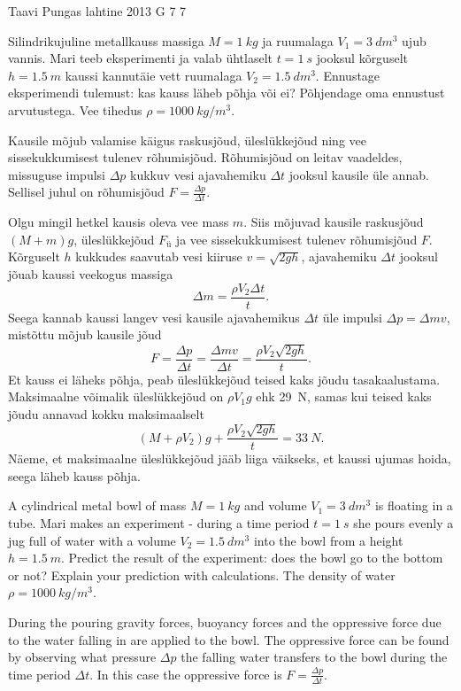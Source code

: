 {Taavi Pungas} %
{lahtine} %
{2013} %
{G 7} %
{7} %
{
\ifStatement
Silindrikujuline metallkauss massiga $M=\SI{1}{kg}$ ja ruumalaga
$V_1=\SI{3}{dm^3}$ ujub vannis. Mari teeb eksperimenti ja valab ühtlaselt
$t=\SI{1}{s}$ jooksul kõrguselt $h=\SI{1,5}{m}$ kaussi kannutäie vett ruumalaga
$V_2=\SI{1,5}{dm^3}$. Ennustage eksperimendi tulemust: kas kauss läheb põhja või
ei? Põhjendage oma ennustust arvutustega. Vee tihedus $\rho=\SI{1000}{kg/m^3}$.
\fi


\ifHint
Kausile mõjub valamise käigus raskusjõud, üleslükkejõud ning vee sissekukkumisest tulenev rõhumisjõud. Rõhumisjõud on leitav vaadeldes, missuguse impulsi $\Delta p$ kukkuv vesi ajavahemiku $\Delta t$ jooksul kausile üle annab. Sellisel juhul on rõhumisjõud $F = \frac{\Delta p}{\Delta t}$.
\fi


\ifSolution
Olgu mingil hetkel kausis oleva vee mass $m$. Siis mõjuvad kausile raskusjõud $(M+m)g$, üleslükkejõud $F_{ü}$ ja vee sissekukkumisest tulenev rõhumisjõud $F$. Kõrguselt $h$ kukkudes saavutab vesi kiiruse $v=\sqrt{2gh}$, ajavahemiku $\Delta t$ jooksul jõuab kaussi veekogus massiga
\[
\Delta m = \frac{\rho V_2 \Delta t}{t}.
\]
Seega kannab kaussi langev vesi kausile ajavahemikus $\Delta t$ üle impulsi $\Delta p =\Delta m v$, mistõttu mõjub kausile jõud
\[
F=\frac{\Delta p}{\Delta t}=\frac{\Delta m v}{\Delta t}=\frac{\rho V_2 \sqrt{2gh}}{t}.
\]
Et kauss ei läheks põhja, peab üleslükkejõud teised kaks jõudu tasakaalustama. Maksimaalne võimalik üleslükkejõud on $\rho V_1 g$ ehk \SI{29}{N}, samas kui teised kaks jõudu annavad kokku maksimaalselt
\[
(M+\rho V_2)g + \frac{\rho V_2 \sqrt{2gh}}{t} = \SI{33}{N}.
\]
Näeme, et maksimaalne üleslükkejõud jääb liiga väikseks, et kaussi ujumas hoida, seega läheb kauss põhja.
\fi


\ifEngStatement
A cylindrical metal bowl of mass $M=\SI{1}{kg}$ and volume $V_1=\SI{3}{dm^3}$ is floating in a tube. Mari makes an experiment - during a time period $t=\SI{1}{s}$ she pours evenly a jug full of water with a volume $V_2=\SI{1,5}{dm^3}$ into the bowl from a height $h=\SI{1,5}{m}$. Predict the result of the experiment: does the bowl go to the bottom or not? Explain your prediction with calculations. The density of water $\rho=\SI{1000}{kg/m^3}$.
\fi


\ifEngHint
During the pouring gravity forces, buoyancy forces and the oppressive force due to the water falling in are applied to the bowl. The oppressive force can be found by observing what pressure $\Delta p$ the falling water transfers to the bowl during the time period $\Delta t$. In this case the oppressive force is $F = \frac{\Delta p}{\Delta t}$.
\fi


}
